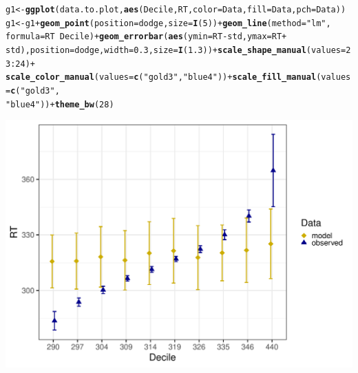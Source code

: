\documentclass{article}\usepackage[]{graphicx}\usepackage[]{color}
\makeatletter
\def\maxwidth{ %
  \ifdim\Gin@nat@width>\linewidth
    \linewidth
  \else
    \Gin@nat@width
  \fi
}
\newcommand{\hlnum}[1]{\textcolor[rgb]{0.686,0.059,0.569}{#1}}%
\newcommand{\hlstr}[1]{\textcolor[rgb]{0.192,0.494,0.8}{#1}}%
\newcommand{\hlopt}[1]{\textcolor[rgb]{0,0,0}{#1}}%
\newcommand{\hlstd}[1]{\textcolor[rgb]{0.345,0.345,0.345}{#1}}%
\newcommand{\hlkwb}[1]{\textcolor[rgb]{0.69,0.353,0.396}{#1}}%
\newcommand{\hlkwc}[1]{\textcolor[rgb]{0.333,0.667,0.333}{#1}}%
\newcommand{\hlkwd}[1]{\textcolor[rgb]{0.737,0.353,0.396}{\textbf{#1}}}%
\newenvironment{kframe}{%
 \def\at@end@of@kframe{}%
 \ifinner\ifhmode%
  \def\at@end@of@kframe{\end{minipage}}%
  \begin{minipage}{\columnwidth}%
 \fi\fi%
 \def\FrameCommand##1{\hskip\@totalleftmargin \hskip-\fboxsep
 \colorbox{shadecolor}{##1}\hskip-\fboxsep
     \hskip-\linewidth \hskip-\@totalleftmargin \hskip\columnwidth}%
 \MakeFramed {\advance\hsize-\width
   \@totalleftmargin\z@ \linewidth\hsize
   \@setminipage}}%
 {\par\unskip\endMakeFramed%
 \at@end@of@kframe}
\newenvironment{knitrout}{}{} %
\makeatother
\begin{document}
\begin{knitrout}
\begin{kframe}
\begin{alltt}
\hlstd{g1} \hlkwb{<-} \hlkwd{ggplot}\hlstd{(data.to.plot,} \hlkwd{aes}\hlstd{(Decile, RT,} \hlkwc{color} \hlstd{= Data,} \hlkwc{fill} \hlstd{= Data,} \hlkwc{pch} \hlstd{= Data))}
\hlstd{g1} \hlkwb{<-} \hlstd{g1} \hlopt{+} \hlkwd{geom_point}\hlstd{(}\hlkwc{position} \hlstd{= dodge,} \hlkwc{size} \hlstd{=} \hlkwd{I}\hlstd{(}\hlnum{5}\hlstd{))} \hlopt{+} \hlkwd{geom_line}\hlstd{(}\hlkwc{method} \hlstd{=} \hlstr{"lm"}\hlstd{,}
    \hlkwc{formula} \hlstd{= RT} \hlopt{~} \hlstd{Decile)} \hlopt{+} \hlkwd{geom_errorbar}\hlstd{(}\hlkwd{aes}\hlstd{(}\hlkwc{ymin} \hlstd{= RT} \hlopt{-} \hlstd{std,} \hlkwc{ymax} \hlstd{= RT} \hlopt{+}
    \hlstd{std),} \hlkwc{position} \hlstd{= dodge,} \hlkwc{width} \hlstd{=} \hlnum{0.3}\hlstd{,} \hlkwc{size} \hlstd{=} \hlkwd{I}\hlstd{(}\hlnum{1.3}\hlstd{))} \hlopt{+} \hlkwd{scale_shape_manual}\hlstd{(}\hlkwc{values} \hlstd{=} \hlnum{23}\hlopt{:}\hlnum{24}\hlstd{)} \hlopt{+}
    \hlkwd{scale_color_manual}\hlstd{(}\hlkwc{values} \hlstd{=} \hlkwd{c}\hlstd{(}\hlstr{"gold3"}\hlstd{,} \hlstr{"blue4"}\hlstd{))} \hlopt{+} \hlkwd{scale_fill_manual}\hlstd{(}\hlkwc{values} \hlstd{=} \hlkwd{c}\hlstd{(}\hlstr{"gold3"}\hlstd{,}
    \hlstr{"blue4"}\hlstd{))} \hlopt{+} \hlkwd{theme_bw}\hlstd{(}\hlnum{28}\hlstd{)}
\end{alltt}


{\ttfamily\noindent\color{warningcolor}{\#\# Warning: Ignoring unknown parameters: method, formula}}\end{kframe}
\end{knitrout}
\begin{knitrout}
\color{fgcolor}\begin{kframe}


{\ttfamily\noindent\itshape\color{messagecolor}{\#\# geom\_path: Each group consists of only one observation. Do you need to\\\#\# adjust the group aesthetic?}}\end{kframe}
\includegraphics[width=\maxwidth]{figures/figure_ns_unnamed-chunk-19-1} 

\end{knitrout}
\end{document}
